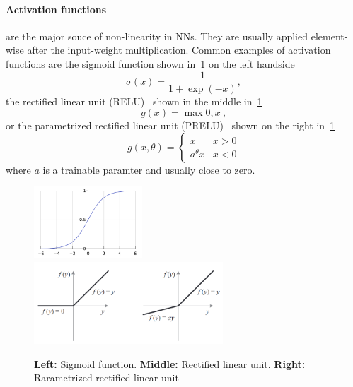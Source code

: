 \paragraph{Activation functions} are the major souce of non-linearity in NNs.
They are usually applied element-wise after the input-weight multiplication.
Common examples of activation functions are the sigmoid function shown in~\ref{activations} on the left handside
\[ \sigma(x) = \frac{1}{1 + \exp(-x)}, \]
the rectified linear unit (RELU)~\autocite{nair_rectified_2010} shown in the middle in~\ref{activations}
\[ g(x) = \max 0, x \ , \]
or the parametrized rectified linear unit (PRELU)~\autocite{he_delving_2015} shown on the right in~\ref{activations}
\[ g(x, \theta) = \begin{cases}
           x & x > 0 \\
           a^\theta x & x < 0
          \end{cases}
  \]
  where $a$ is a trainable paramter and usually close to zero.
\begin{figure}[h]
      \begin{center}
         \includegraphics[keepaspectratio, width=0.36\textwidth]{img/sigmoid.png}
         \includegraphics[keepaspectratio, width=0.63\textwidth]{img/relus.png}
      \end{center}
      \caption{
         \textbf{Left:} Sigmoid function.
         \textbf{Middle:} Rectified linear unit.
         \textbf{Right:} Rarametrized rectified linear unit~\autocite{he_delving_2015}
      }
      \label{activations}
\end{figure}

